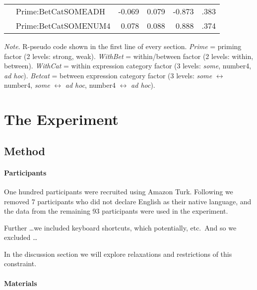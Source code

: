 \documentclass[10pt]{article}
\begin{document}
\begin{multicols}{2}
\begin{table*}[ht]
\begin{center}
\begin{tabular}{llrrrr}
      & Prime:BetCatSOMEADH & -0.069 & 0.079 & -0.873 & .383 \\
      & Prime:BetCatSOMENUM4 & 0.078 & 0.088 & 0.888 & .374 \\
      \hline
    \end{tabular}
\end{center}
\emph{Note}. R-pseudo code shown in the first line of every section.
  \emph{Prime} = priming factor (2 levels: strong, weak).
  \emph{WithBet} = within/between factor (2 levels: within, between).
  \emph{WithCat} = within expression category factor (3 levels: \emph{some}, number4, \emph{ad hoc}).
  \emph{Betcat} = between expression category factor (3 levels: \emph{some} \(\leftrightarrow\) number4, \emph{some} \(\leftrightarrow\) \emph{ad hoc}, number4 \(\leftrightarrow\) \emph{ad hoc}).
\end{table*}



\section{The Experiment}
\label{sec:experiment}



\subsection{Method}
\label{sec:method}


\paragraph{Participants}

One hundred participants were recruited using Amazon Turk.
Following \citeauthor{Bott:2016aa} we removed 7 participants who did not declare English as their native language, and the data from the remaining 93 participants were used in the experiment.

{\color{red} Further \dots we included keyboard shortcuts, which potentially, etc.\ And so we excluded \dots}

In the discussion section we will explore relaxations and restrictions of this constraint.

\paragraph{Materials}


\end{multicols}
\end{document}
